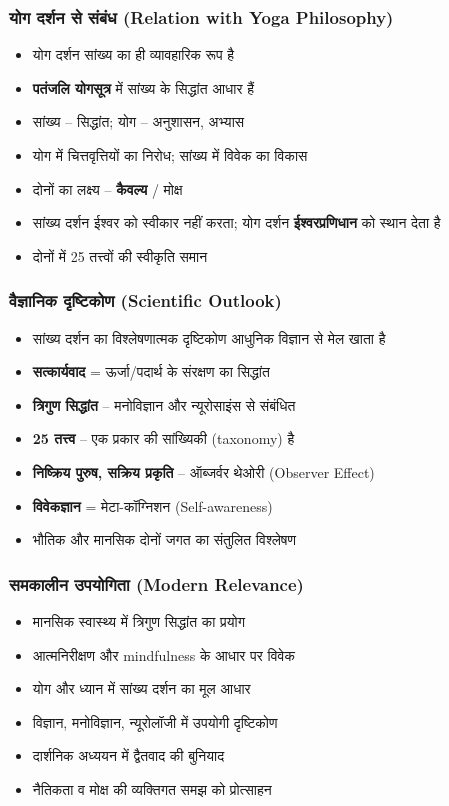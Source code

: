 \begin{frame}[fragile]\frametitle{योग दर्शन से संबंध (Relation with Yoga Philosophy)}
\begin{itemize}
  \item योग दर्शन सांख्य का ही व्यावहारिक रूप है
  \item \textbf{पतंजलि योगसूत्र} में सांख्य के सिद्धांत आधार हैं
  \item सांख्य – सिद्धांत; योग – अनुशासन, अभ्यास
  \item योग में चित्तवृत्तियों का निरोध; सांख्य में विवेक का विकास
  \item दोनों का लक्ष्य – \textbf{कैवल्य} / मोक्ष
  \item सांख्य दर्शन ईश्वर को स्वीकार नहीं करता; योग दर्शन \textbf{ईश्वरप्रणिधान} को स्थान देता है
  \item दोनों में 25 तत्त्वों की स्वीकृति समान
\end{itemize}
\end{frame}

\begin{frame}[fragile]\frametitle{वैज्ञानिक दृष्टिकोण (Scientific Outlook)}
\begin{itemize}
  \item सांख्य दर्शन का विश्लेषणात्मक दृष्टिकोण आधुनिक विज्ञान से मेल खाता है
  \item \textbf{सत्कार्यवाद} = ऊर्जा/पदार्थ के संरक्षण का सिद्धांत
  \item \textbf{त्रिगुण सिद्धांत} – मनोविज्ञान और न्यूरोसाइंस से संबंधित
  \item \textbf{25 तत्त्व} – एक प्रकार की सांख्यिकी (taxonomy) है
  \item \textbf{निष्क्रिय पुरुष, सक्रिय प्रकृति} – ऑब्जर्वर थेओरी (Observer Effect)
  \item \textbf{विवेकज्ञान} = मेटा-कॉग्निशन (Self-awareness)
  \item भौतिक और मानसिक दोनों जगत का संतुलित विश्लेषण
\end{itemize}
\end{frame}

\begin{frame}[fragile]\frametitle{समकालीन उपयोगिता (Modern Relevance)}
\begin{itemize}
  \item मानसिक स्वास्थ्य में त्रिगुण सिद्धांत का प्रयोग
  \item आत्मनिरीक्षण और mindfulness के आधार पर विवेक
  \item योग और ध्यान में सांख्य दर्शन का मूल आधार
  \item विज्ञान, मनोविज्ञान, न्यूरोलॉजी में उपयोगी दृष्टिकोण
  \item दार्शनिक अध्ययन में द्वैतवाद की बुनियाद
  \item नैतिकता व मोक्ष की व्यक्तिगत समझ को प्रोत्साहन
\end{itemize}
\end{frame}

